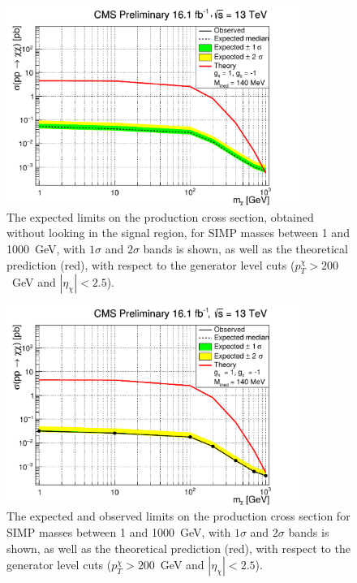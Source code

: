 \begin{figure}[ht]
  \centering
  \includegraphics[width=0.85\textwidth]{figures/ExclusionLimitGH_xsecVsM_ChF0p05_1leg_HybridNew_gmN_neutrons.pdf}\hfill%
  \caption{The expected limits on the production cross section, obtained without looking in the signal region, for \ac{SIMP} masses between 1 and 1000~GeV, with $1\sigma$ and $2\sigma$ bands is shown, as well as the theoretical prediction (red), with respect to the generator level cuts ($p_T^{\chi} > 200$~GeV and $|\eta_{\chi}| < 2.5$).}
  \label{fig:SIMP_limit}
\end{figure}

\begin{figure}[ht]
  \centering
  \includegraphics[width=0.85\textwidth]{figures/ExclusionLimitGH_xsecVsM_ChF0p05_1leg_HybridNew_gmN_neutrons_unblinded.pdf}\hfill%
  \caption{The expected and observed limits on the production cross section for \ac{SIMP} masses between 1 and 1000~GeV, with $1\sigma$ and $2\sigma$ bands is shown, as well as the theoretical prediction (red), with respect to the generator level cuts ($p_T^{\chi} > 200$~GeV and $|\eta_{\chi}| < 2.5$).}
  \label{fig:SIMP_limit_unblinded}
\end{figure}

